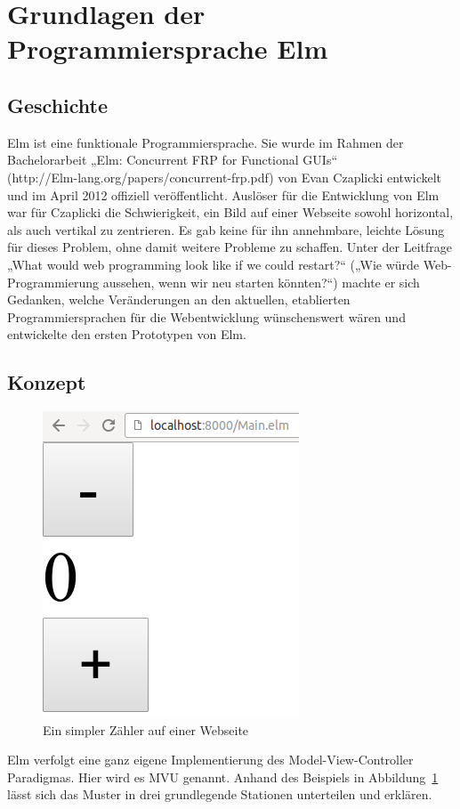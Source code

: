 \section{Grundlagen der Programmiersprache Elm}
\label{sec:Was ist Elm?}

\subsection{Geschichte}
\label{sec:Geschichte}
Elm ist eine funktionale Programmiersprache. Sie wurde im Rahmen der Bachelorarbeit „Elm: Concurrent FRP for Functional GUIs“\\
 (http://Elm-lang.org/papers/concurrent-frp.pdf)
von Evan Czaplicki entwickelt und im April 2012 offiziell veröffentlicht.
Auslöser für die Entwicklung von Elm war für Czaplicki die Schwierigkeit, ein Bild auf einer Webseite sowohl horizontal, als auch vertikal zu zentrieren. Es gab keine für ihn annehmbare, leichte Lösung für dieses Problem, ohne damit weitere Probleme zu schaffen. Unter der Leitfrage „What would web programming look like if we could restart?“ („Wie würde Web-Programmierung aussehen, wenn wir neu starten könnten?“) machte er sich Gedanken, welche Veränderungen an den aktuellen, etablierten Programmiersprachen für die Webentwicklung wünschenswert wären und entwickelte den ersten Prototypen von Elm.

\subsection{Konzept}
\label{sec:Konzept}
\begin{figure}[h]
	\centering  
	\includegraphics[scale=0.5]{img/counter.png}
	\caption{Ein simpler Zähler auf einer Webseite}\label{fig:counter}
\end{figure}
\noindent Elm verfolgt eine ganz eigene Implementierung des Model-View-Controller Paradigmas. Hier wird es \ac{MVU} genannt. Anhand des Beispiels in Abbildung~\ref{fig:counter} lässt sich das Muster in drei grundlegende Stationen unterteilen und erklären.

